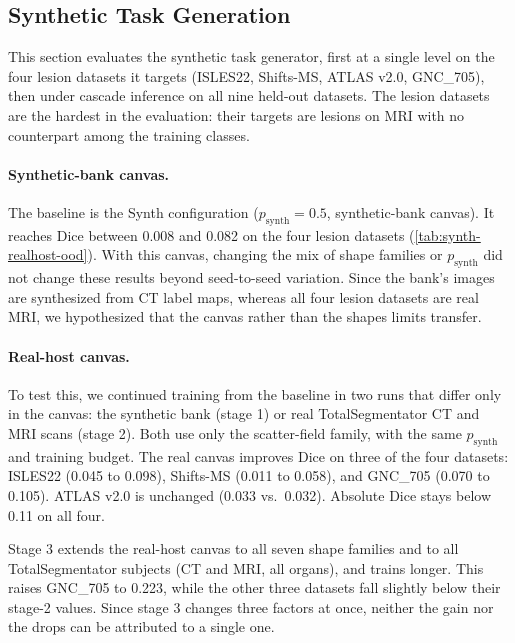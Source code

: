\subsection{Synthetic Task Generation}\label{sec:results-synth}

This section evaluates the synthetic task generator, first at a single level
on the four lesion datasets it targets (ISLES22, Shifts-MS, ATLAS v2.0,
GNC\_705), then under cascade inference on all nine held-out datasets. The
lesion datasets are the hardest in the evaluation: their targets are lesions
on MRI with no counterpart among the training classes.


\paragraph{Synthetic-bank canvas.}
The baseline is the Synth configuration ($p_\text{synth} = 0.5$,
synthetic-bank canvas). It reaches Dice between 0.008 and 0.082 on the four
lesion datasets (\autoref{tab:synth-realhost-ood}). With this canvas, changing
the mix of shape families or $p_\text{synth}$ did not change these results
beyond seed-to-seed variation. Since the bank's images are synthesized from CT
label maps, whereas all four lesion datasets are real MRI, we hypothesized
that the canvas rather than the shapes limits transfer.


\paragraph{Real-host canvas.}
To test this, we continued training from the baseline in two runs that differ
only in the canvas: the synthetic bank (stage 1) or real TotalSegmentator
CT and MRI scans (stage 2). Both use only the scatter-field family, with the same
$p_\text{synth}$ and training budget. The real canvas improves Dice on three of
the four datasets: ISLES22 (0.045 to 0.098), Shifts-MS (0.011 to 0.058), and
GNC\_705 (0.070 to 0.105). ATLAS v2.0 is unchanged (0.033 vs.\ 0.032).
Absolute Dice stays below 0.11 on all four.

Stage 3 extends the real-host canvas to all seven shape families and to all
TotalSegmentator subjects (CT and MRI, all organs), and trains longer. This
raises GNC\_705 to 0.223, while the other three datasets fall slightly below
their stage-2 values. Since stage 3 changes three factors at once, neither the
gain nor the drops can be attributed to a single one.

